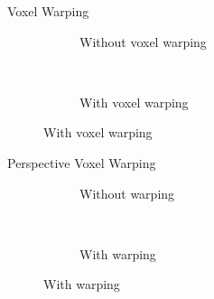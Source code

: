 \documentclass[10pt]{beamer}
\begin{document}
\begin{frame}{Voxel Warping}
  \begin{figure}
    \begin{subfigure}[t]{0.475\textwidth}
      \caption*{Without voxel warping}
    \end{subfigure}
    ~
    \begin{subfigure}[t]{0.475\textwidth}
      \caption*{With voxel warping}
    \end{subfigure}
  \end{figure}
\end{frame}

\begin{frame}{Perspective Voxel Warping}
  \begin{figure}
    \begin{subfigure}[t]{0.475\textwidth}
      \caption*{Without warping}
    \end{subfigure}
    ~
    \begin{subfigure}[t]{0.475\textwidth}
      \caption*{With warping}
    \end{subfigure}
  \end{figure}
\end{frame}
\end{document}
